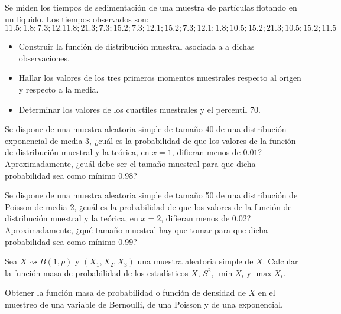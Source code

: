 \begin{ejercicio}
    Se miden los tiempos de sedimentación de una muestra de partículas flotando en un líquido. Los tiempos observados son: 
    \begin{equation*}
        11.5; 1.8; 7.3; 12.1 1.8; 21.3; 7.3; 15.2; 7.3; 12.1; 15.2; 7.3; 12.1; 1.8; 10.5; 15.2; 21.3; 10.5; 15.2; 11.5
    \end{equation*}
    \begin{itemize}
        \item Construir la función de distribución muestral asociada a a dichas observaciones.
        \item Hallar los valores de los tres primeros momentos muestrales respecto al origen y respecto a la media.
        \item Determinar los valores de los cuartiles muestrales y el percentil 70.
    \end{itemize}
\end{ejercicio}

\begin{ejercicio}
    Se dispone de una muestra aleatoria simple de tamaño 40 de una distribución exponencial de media 3, ¿cuál es la probabilidad de que los valores de la función de distribución muestral y la teórica, en $x=1$, difieran menos de $0.01$? Aproximadamente, ¿cuál debe ser el tamaño muestral para que dicha probabilidad sea como mínimo $0.98$?
\end{ejercicio}

\begin{ejercicio}
    Se dispone de una muestra aleatoria simple de tamaño 50 de una distribución de Poisson de media 2, ¿cuál es la probabilidad de que los valores de la función de distribución muestral y la teórica, en $x=2$, difieran menos de $0.02$? Aproximadamente, ¿qué tamaño muestral hay que tomar para que dicha probabilidad sea como mínimo $0.99$?
\end{ejercicio}

\begin{ejercicio}
   Sea $X\rightsquigarrow B(1,p)$ y $(X_1, X_2, X_3)$ una muestra aleatoria simple de $X$. Calcular la función masa de probabilidad de los estadísticos $\overline{X}$, $S^2$, $\min X_i$ y $\max X_i$.
\end{ejercicio}

\begin{ejercicio}
    Obtener la función masa de probabilidad o función de densidad de $\overline{X}$ en el muestreo de una variable de Bernoulli, de una Poisson y de una exponencial.
\end{ejercicio}

